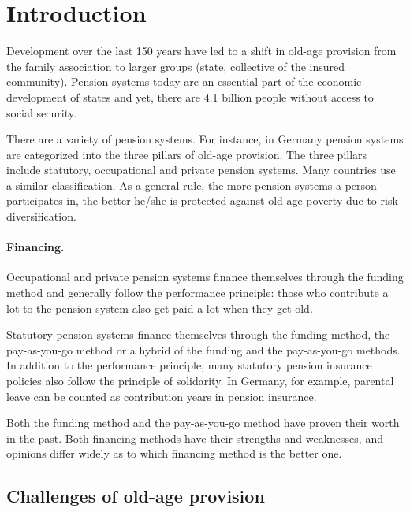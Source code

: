 \section{Introduction}

Development over the last 150 years have led to a shift in old-age provision from the family association to larger groups (state, collective of the insured community). Pension systems today are an essential part of the economic development of states and yet, there are 4.1 billion people without access to social security.\cite{noauthor_universal_2017}

There are a variety of pension systems. For instance, in Germany pension systems are categorized into the three pillars of old-age provision. The three pillars include statutory, occupational and private pension systems. Many countries use a similar classification. As a general rule, the more pension systems a person participates in, the better he/she is protected against old-age poverty due to risk diversification.

\paragraph{Financing.} Occupational and private pension systems finance themselves through the funding method and generally follow the performance principle: those who contribute a lot to the pension system also get paid a lot when they get old.

Statutory pension systems finance themselves through the funding method, the pay-as-you-go method or a hybrid of the funding and the pay-as-you-go methods. In addition to the performance principle, many statutory pension insurance policies also follow the principle of solidarity. In Germany, for example, parental leave can be counted as contribution years in pension insurance.

Both the funding method and the pay-as-you-go method have proven their worth in the past. Both financing methods have their strengths and weaknesses, and opinions differ widely as to which financing method is the better one.

\subsection{Challenges of old-age provision}

